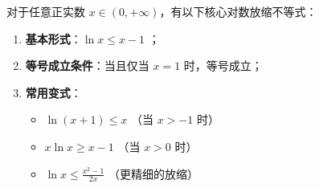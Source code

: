 \begin{statementbox}
对于任意正实数 $x \in (0, +\infty)$，有以下核心对数放缩不等式：
\begin{enumerate}
    \item \textbf{基本形式}：$\ln x \leqslant x - 1$ ；
    \item \textbf{等号成立条件}：当且仅当 $x = 1$ 时，等号成立；
    \item \textbf{常用变式}：
    \begin{itemize}
        \item $\ln(x+1) \leqslant x$ （当 $x > -1$ 时）
        \item $x \ln x \geqslant x - 1$ （当 $x > 0$ 时）
        \item $\ln x \leqslant \frac{x^2-1}{2x}$ （更精细的放缩）
    \end{itemize}
\end{enumerate}
\end{statementbox}
